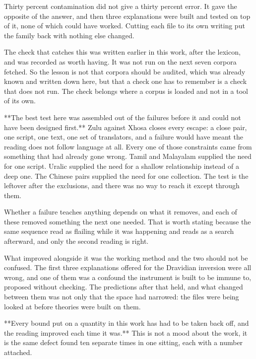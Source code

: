 Thirty percent contamination did not give a thirty percent error. It gave the opposite of the answer, and then three explanations were built and tested on top of it, none of which could have worked. Cutting each file to its own writing put the family back with nothing else changed.

The check that catches this was written earlier in this work, after the lexicon, and was recorded as worth having. It was not run on the next seven corpora fetched. So the lesson is not that corpora should be audited, which was already known and written down here, but that a check one has to remember is a check that does not run. The check belongs where a corpus is loaded and not in a tool of its own.

**The best test here was assembled out of the failures before it and could not have been designed first.** Zulu against Xhosa closes every escape: a close pair, one script, one text, one set of translators, and a failure would have meant the reading does not follow language at all. Every one of those constraints came from something that had already gone wrong. Tamil and Malayalam supplied the need for one script. Uralic supplied the need for a shallow relationship instead of a deep one. The Chinese pairs supplied the need for one collection. The test is the leftover after the exclusions, and there was no way to reach it except through them.

Whether a failure teaches anything depends on what it removes, and each of these removed something the next one needed. That is worth stating because the same sequence read as flailing while it was happening and reads as a search afterward, and only the second reading is right.

What improved alongside it was the working method and the two should not be confused. The first three explanations offered for the Dravidian inversion were all wrong, and one of them was a confound the instrument is built to be immune to, proposed without checking. The predictions after that held, and what changed between them was not only that the space had narrowed: the files were being looked at before theories were built on them.

**Every bound put on a quantity in this work has had to be taken back off, and the reading improved each time it was.** This is not a mood about the work, it is the same defect found ten separate times in one sitting, each with a number attached.

